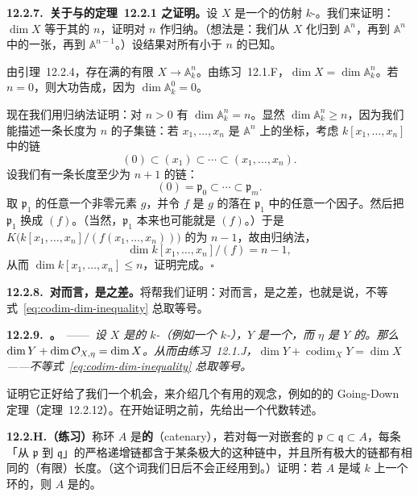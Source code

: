 \textbf{12.2.7.\ 关于\trDimension{}与\trTrDeg{}的定理~12.2.1 之证明。}\quad 设 $X$ 是一个\trIntegral{}的\trFiniteType{}仿射 $k$-\trScheme。我们来证明：$\dim X$ 等于其\trFunctionField{}的\trTrDeg{} $n$，证明对 $n$ 作归纳。（想法是：我们从 $X$ 化归到 $\mathbb{A}^n$，再到 $\mathbb{A}^n$ 中的一张\trHypersurface，再到 $\mathbb{A}^{n-1}$。）设结果对所有小于 $n$ 的\trTrDeg{}已知。

由\trNoetherNormalization{}引理~12.2.4，存在满的有限\trMorphism{} $X\to\mathbb{A}^n_k$。由\mbox{练习~12.1.F}，$\dim X=\dim\mathbb{A}^n_k$。若 $n=0$，则大功告成，因为 $\dim\mathbb{A}^0_k=0$。

现在我们用归纳法证明：对 $n>0$ 有 $\dim\mathbb{A}^n_k=n$。显然 $\dim\mathbb{A}^n_k\ge n$，因为我们能描述一条长度为 $n$ 的\trIrreducible{}子集链：若 $x_1,\dots,x_n$ 是 $\mathbb{A}^n$ 上的坐标，考虑 $k[x_1,\dots,x_n]$ 中的\trIdeal{}链
\[
(0)\subset(x_1)\subset\cdots\subset(x_1,\dots,x_n).
\]
设我们有一条长度至少为 $n+1$ 的\trPrimeIdeal{}链：
\[
(0)=\mathfrak{p}_0\subset\cdots\subset\mathfrak{p}_m.
\]
取 $\mathfrak{p}_1$ 的任意一个非零元素 $g$，并令 $f$ 是 $g$ 的落在 $\mathfrak{p}_1$ 中的任意一个\trIrreducible{}因子。然后把 $\mathfrak{p}_1$ 换成 $(f)$。（当然，$\mathfrak{p}_1$ 本来也可能就是 $(f)$。）于是 $K\bigl(k[x_1,\dots,x_n]/(f(x_1,\dots,x_n))\bigr)$ 的\trTrDeg{}为 $n-1$，故由归纳法，
\[
\dim k[x_1,\dots,x_n]/(f)=n-1,
\]
从而 $\dim k[x_1,\dots,x_n]\le n$，证明完成。\hfill$\square$

\textbf{12.2.8.\ 对\trIrreducible\trVariety{}而言，\trCodimension{}是\trDimension{}之差。}\quad \trNoetherNormalization{}将帮我们证明：对\trIrreducible\trVariety{}而言，\trCodimension{}是\trDimension{}之差，也就是说，不等式~\eqref{eq:codim-dim-inequality} 总取等号。

\textbf{12.2.9.\ \trhTheorem{}。}\ ——\ \emph{设 $X$ 是\trPureDimensional{}的\trLocally\trFiniteType{} $k$-\trScheme{}（例如一个\trIrreducible{} $k$-\trVariety），$Y$ 是一个\trIrreducible\trClosedSubset，而 $\eta$ 是 $Y$ 的\trGenericPoint。那么 $\dim Y+\dim\mathcal{O}_{X,\eta}=\dim X$。从而由\mbox{练习~12.1.J}，$\dim Y+\operatorname{codim}_XY=\dim X$——不等式~\eqref{eq:codim-dim-inequality} 总取等号。}

证明它正好给了我们一个机会，来介绍几个有用的观念，例如\trIntegrallyClosed{}\trIntegralDomain{}的\trFinite\trExtension{}的 Going-Down 定理（定理~12.2.12）。在开始证明之前，先给出一个代数转述。

\textbf{12.2.H.（练习）}\quad 称环 $A$ 是\textbf{\trCatenary{}的}（catenary），若对每一对嵌套的\trPrimeIdeal{} $\mathfrak{p}\subset\mathfrak{q}\subset A$，每条「从 $\mathfrak{p}$ 到 $\mathfrak{q}$」的严格递增\trPrimeIdeal{}链都含于某条极大的这种链中，并且所有极大的链都有相同的（有限）长度。（这个词我们日后不会正经用到。）证明：若 $A$ 是域 $k$ 上一个\trFinitelyGenerated{}环的\trLocalization，则 $A$ 是\trCatenary{}的。

